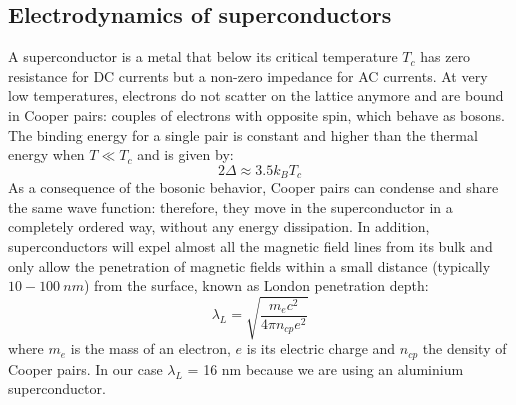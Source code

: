 \documentclass[12pt]{article}
\begin{document}
\subsection{Electrodynamics of superconductors}
A superconductor is a metal that below its critical temperature $T_c$ has zero resistance for DC currents but a non-zero impedance for AC currents. At very low temperatures, electrons do not scatter on the lattice anymore and are bound in Cooper pairs: couples of electrons with opposite spin, which behave as bosons.
The binding energy for a single pair is constant and higher than the thermal energy when  $T \ll T_c$ and is given by:
\begin{equation}
    2\Delta\approx3.5 k_B T_c
\end{equation}
As a consequence of the bosonic behavior, Cooper pairs can condense and share the same wave function: therefore, they move in the superconductor in a completely ordered way, without any energy dissipation. In addition, superconductors will expel almost all the magnetic field lines from its bulk and only allow the penetration of magnetic fields within a small distance (typically $10-100 ~nm$) from the surface, known as London penetration depth:
\begin{equation}
    \lambda_{L} = \sqrt{\frac{m_e c^2}{4 \pi n_{cp} e^2}}
\end{equation}
where $m_e$ is the mass of an electron, $e$ is its electric charge and $n_{cp}$ the density of Cooper pairs. In our case $\lambda_L$ = 16 nm because we are using an aluminium superconductor.
\end{document}
